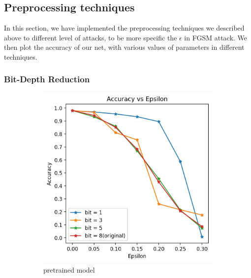 \subsection{Preprocessing techniques}
In this section, we have implemented the preprocessing techniques we described above to different level of attacks, to be more specific the $\epsilon$ in FGSM attack. We then plot the accuracy of our net, with various values of parameters in different techniques.

\subsubsection{Bit-Depth Reduction}

\begin{figure}[h!]
	\centering
	\begin{subfigure}{.4\textwidth}
		\includegraphics[width=\textwidth]{pretrained_Accuracy_vs_Epsilon_db.jpg}
		\caption{pretrained model}
		\label{fig: bit-depth reduction pre}
	\end{subfigure}
	\begin{subfigure}{.4\textwidth}

\end{subfigure}
\end{figure}
